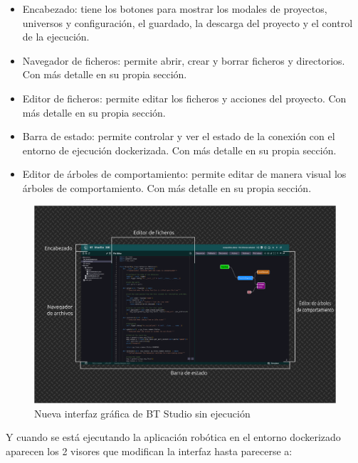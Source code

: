 \begin{itemize}
    \item Encabezado: tiene los botones para mostrar los modales de proyectos, universos y configuración, el guardado, la descarga del proyecto y el control de la ejecución. 
    \item Navegador de ficheros: permite abrir, crear y borrar ficheros y directorios. Con más detalle en su propia sección.
    \item Editor de ficheros: permite editar los ficheros y acciones del proyecto. Con más detalle en su propia sección.
    \item Barra de estado: permite controlar y ver el estado de la conexión con el entorno de ejecución dockerizada. Con más detalle en su propia sección.
    \item Editor de árboles de comportamiento: permite editar de manera visual los árboles de comportamiento. Con más detalle en su propia sección.
\end{itemize}

\begin{figure}[H]
    \centering
    \includegraphics[width=\textwidth]{figures/bt-avances/bt-tetxo.png}
    \caption{Nueva interfaz gráfica de BT Studio sin ejecución}
    \label{fig:bt-int}
\end{figure}

Y cuando se está ejecutando la aplicación robótica en el entorno dockerizado aparecen los 2 visores que modifican la interfaz hasta parecerse a:


